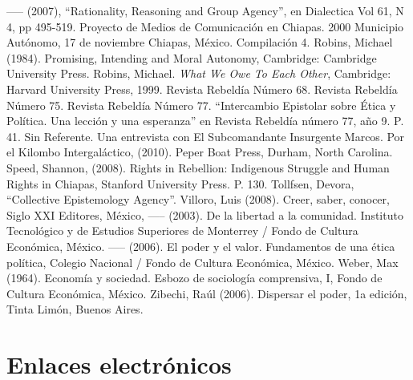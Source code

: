 \documentclass[oneside]{book}
\begin{document}
\begin{thebibliography}{99}
 ----- (2007), “Rationality, Reasoning and Group Agency”,  en Dialectica Vol 61, N 4, pp 495-519.
 Proyecto de Medios de Comunicación en Chiapas. 2000 Municipio Autónomo, 17 de noviembre Chiapas, México. Compilación 4.
 Robins, Michael (1984). Promising, Intending and Moral Autonomy, Cambridge: Cambridge University Press. 
 Robins, Michael. \textit{What We Owe To Each Other}, Cambridge: Harvard University Press, 1999.
 Revista Rebeldía Número 68.
 Revista Rebeldía Número 75.
 Revista Rebeldía Número 77. “Intercambio Epistolar sobre Ética y Política. Una lección y una esperanza” en Revista Rebeldía número 77, año 9. P. 41.
 Sin Referente. Una entrevista con El Subcomandante Insurgente Marcos. Por el Kilombo Intergaláctico, (2010).  Peper Boat Press, Durham, North Carolina.
 Speed, Shannon, (2008). Rights in Rebellion: Indigenous Struggle and Human Rights in Chiapas, Stanford University Press. P. 130.
 Tollfsen, Devora, “Collective Epistemology Agency”.
 Villoro, Luis (2008). Creer, saber, conocer, Siglo XXI Editores, México, 
 ----- (2003). De la libertad a la comunidad. Instituto Tecnológico y de Estudios Superiores de Monterrey / Fondo de Cultura Económica, México.
 ----- (2006). El poder y el valor. Fundamentos de una ética política, Colegio Nacional / Fondo de Cultura Económica, México.
 Weber, Max (1964). Economía y sociedad. Esbozo de sociología comprensiva, I, Fondo de Cultura Económica, México.
 Zibechi, Raúl (2006). Dispersar el poder, 1a edición, Tinta Limón, Buenos Aires.

\end{thebibliography}

\chapter*{Enlaces electrónicos}
\end{document}
